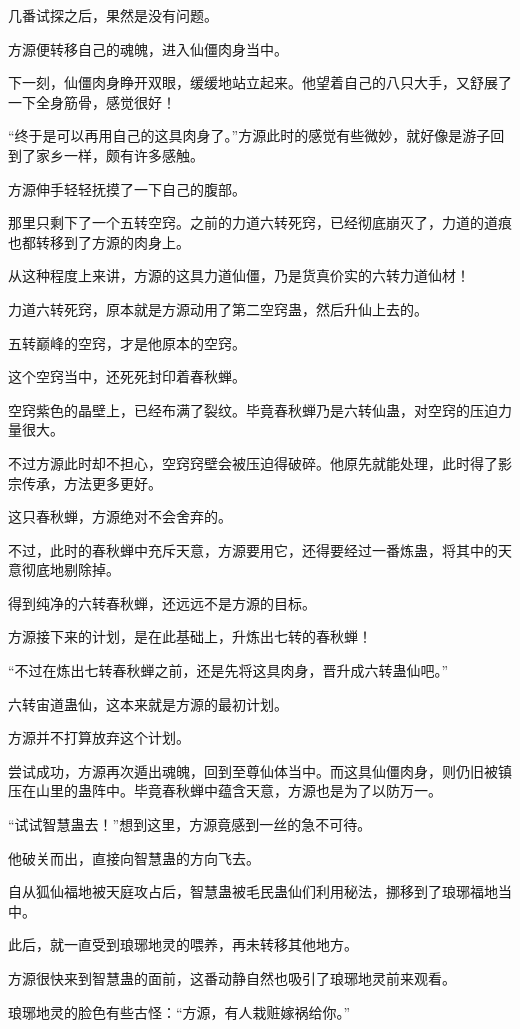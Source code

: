 \begin{this_body}
几番试探之后，果然是没有问题。

方源便转移自己的魂魄，进入仙僵肉身当中。

下一刻，仙僵肉身睁开双眼，缓缓地站立起来。他望着自己的八只大手，又舒展了一下全身筋骨，感觉很好！

“终于是可以再用自己的这具肉身了。”方源此时的感觉有些微妙，就好像是游子回到了家乡一样，颇有许多感触。

方源伸手轻轻抚摸了一下自己的腹部。

那里只剩下了一个五转空窍。之前的力道六转死窍，已经彻底崩灭了，力道的道痕也都转移到了方源的肉身上。

从这种程度上来讲，方源的这具力道仙僵，乃是货真价实的六转力道仙材！

力道六转死窍，原本就是方源动用了第二空窍蛊，然后升仙上去的。

五转巅峰的空窍，才是他原本的空窍。

这个空窍当中，还死死封印着春秋蝉。

空窍紫色的晶壁上，已经布满了裂纹。毕竟春秋蝉乃是六转仙蛊，对空窍的压迫力量很大。

不过方源此时却不担心，空窍窍壁会被压迫得破碎。他原先就能处理，此时得了影宗传承，方法更多更好。

这只春秋蝉，方源绝对不会舍弃的。

不过，此时的春秋蝉中充斥天意，方源要用它，还得要经过一番炼蛊，将其中的天意彻底地剔除掉。

得到纯净的六转春秋蝉，还远远不是方源的目标。

方源接下来的计划，是在此基础上，升炼出七转的春秋蝉！

“不过在炼出七转春秋蝉之前，还是先将这具肉身，晋升成六转蛊仙吧。”

六转宙道蛊仙，这本来就是方源的最初计划。

方源并不打算放弃这个计划。

尝试成功，方源再次遁出魂魄，回到至尊仙体当中。而这具仙僵肉身，则仍旧被镇压在山里的蛊阵中。毕竟春秋蝉中蕴含天意，方源也是为了以防万一。

“试试智慧蛊去！”想到这里，方源竟感到一丝的急不可待。

他破关而出，直接向智慧蛊的方向飞去。

自从狐仙福地被天庭攻占后，智慧蛊被毛民蛊仙们利用秘法，挪移到了琅琊福地当中。

此后，就一直受到琅琊地灵的喂养，再未转移其他地方。

方源很快来到智慧蛊的面前，这番动静自然也吸引了琅琊地灵前来观看。

琅琊地灵的脸色有些古怪：“方源，有人栽赃嫁祸给你。”


\end{this_body}
